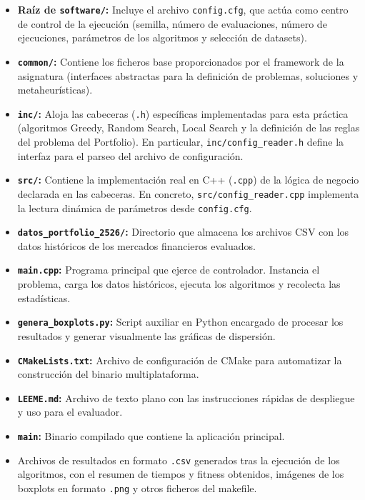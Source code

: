 \begin{itemize}
    \item \textbf{Raíz de \texttt{software/}:} Incluye el archivo \texttt{config.cfg}, que actúa como centro de control de la ejecución (semilla, número de evaluaciones, número de ejecuciones, parámetros de los algoritmos y selección de datasets).
    \item \textbf{\texttt{common/}:} Contiene los ficheros base proporcionados por el framework de la asignatura (interfaces abstractas para la definición de problemas, soluciones y metaheurísticas).
    \item \textbf{\texttt{inc/}:} Aloja las cabeceras (\texttt{.h}) específicas implementadas para esta práctica (algoritmos Greedy, Random Search, Local Search y la definición de las reglas del problema del Portfolio). En particular, \texttt{inc/config\_reader.h} define la interfaz para el parseo del archivo de configuración.
    \item \textbf{\texttt{src/}:} Contiene la implementación real en C++ (\texttt{.cpp}) de la lógica de negocio declarada en las cabeceras. En concreto, \texttt{src/config\_reader.cpp} implementa la lectura dinámica de parámetros desde \texttt{config.cfg}.
    \item \textbf{\texttt{datos\_portfolio\_2526/}:} Directorio que almacena los archivos CSV con los datos históricos de los mercados financieros evaluados.
    \item \textbf{\texttt{main.cpp}:} Programa principal que ejerce de controlador. Instancia el problema, carga los datos históricos, ejecuta los algoritmos y recolecta las estadísticas.
    \item \textbf{\texttt{genera\_boxplots.py}:} Script auxiliar en Python encargado de procesar los resultados y generar visualmente las gráficas de dispersión.
    \item \textbf{\texttt{CMakeLists.txt}:} Archivo de configuración de CMake para automatizar la construcción del binario multiplataforma.
    \item \textbf{\texttt{LEEME.md}:} Archivo de texto plano con las instrucciones rápidas de despliegue y uso para el evaluador.
    \item \textbf{\texttt{main}:} Binario compilado que contiene la aplicación principal.
    \item Archivos de resultados en formato \texttt{.csv} generados tras la ejecución de los algoritmos, con el resumen de tiempos y fitness obtenidos, imágenes de los boxplots en formato \texttt{.png} y otros ficheros del makefile.
\end{itemize}

